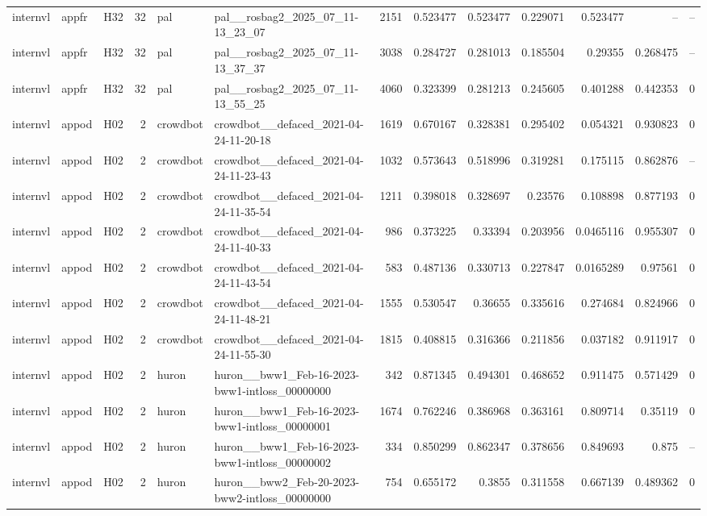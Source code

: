 \begin{longtable}{lllrllrrrrrrr}
internvl & appfr & H32 & 32 & pal & pal\_\_rosbag2\_2025\_07\_11-13\_23\_07 & 2151 & 0.523477 & 0.523477 & 0.229071 & 0.523477 & -- & -- \\
internvl & appfr & H32 & 32 & pal & pal\_\_rosbag2\_2025\_07\_11-13\_37\_37 & 3038 & 0.284727 & 0.281013 & 0.185504 & 0.29355 & 0.268475 & -- \\
internvl & appfr & H32 & 32 & pal & pal\_\_rosbag2\_2025\_07\_11-13\_55\_25 & 4060 & 0.323399 & 0.281213 & 0.245605 & 0.401288 & 0.442353 & 0 \\
internvl & appod & H02 & 2 & crowdbot & crowdbot\_\_defaced\_2021-04-24-11-20-18 & 1619 & 0.670167 & 0.328381 & 0.295402 & 0.054321 & 0.930823 & 0 \\
internvl & appod & H02 & 2 & crowdbot & crowdbot\_\_defaced\_2021-04-24-11-23-43 & 1032 & 0.573643 & 0.518996 & 0.319281 & 0.175115 & 0.862876 & -- \\
internvl & appod & H02 & 2 & crowdbot & crowdbot\_\_defaced\_2021-04-24-11-35-54 & 1211 & 0.398018 & 0.328697 & 0.23576 & 0.108898 & 0.877193 & 0 \\
internvl & appod & H02 & 2 & crowdbot & crowdbot\_\_defaced\_2021-04-24-11-40-33 & 986 & 0.373225 & 0.33394 & 0.203956 & 0.0465116 & 0.955307 & 0 \\
internvl & appod & H02 & 2 & crowdbot & crowdbot\_\_defaced\_2021-04-24-11-43-54 & 583 & 0.487136 & 0.330713 & 0.227847 & 0.0165289 & 0.97561 & 0 \\
internvl & appod & H02 & 2 & crowdbot & crowdbot\_\_defaced\_2021-04-24-11-48-21 & 1555 & 0.530547 & 0.36655 & 0.335616 & 0.274684 & 0.824966 & 0 \\
internvl & appod & H02 & 2 & crowdbot & crowdbot\_\_defaced\_2021-04-24-11-55-30 & 1815 & 0.408815 & 0.316366 & 0.211856 & 0.037182 & 0.911917 & 0 \\
internvl & appod & H02 & 2 & huron & huron\_\_bww1\_Feb-16-2023-bww1-intloss\_00000000 & 342 & 0.871345 & 0.494301 & 0.468652 & 0.911475 & 0.571429 & 0 \\
internvl & appod & H02 & 2 & huron & huron\_\_bww1\_Feb-16-2023-bww1-intloss\_00000001 & 1674 & 0.762246 & 0.386968 & 0.363161 & 0.809714 & 0.35119 & 0 \\
internvl & appod & H02 & 2 & huron & huron\_\_bww1\_Feb-16-2023-bww1-intloss\_00000002 & 334 & 0.850299 & 0.862347 & 0.378656 & 0.849693 & 0.875 & -- \\
internvl & appod & H02 & 2 & huron & huron\_\_bww2\_Feb-20-2023-bww2-intloss\_00000000 & 754 & 0.655172 & 0.3855 & 0.311558 & 0.667139 & 0.489362 & 0 \\

\end{longtable}
